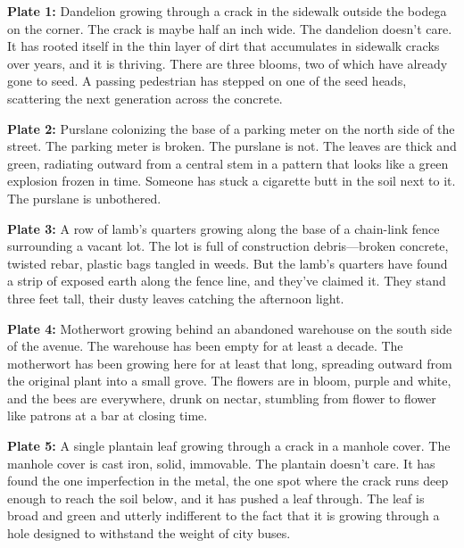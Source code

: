 \documentclass[
    language=english,
    doctype=zine,
    institution=none,
]{../../omnilatex}
\begin{document}
\begin{center}
\begin{minipage}{0.9\textwidth}

\textbf{Plate 1:} Dandelion growing through a crack in the sidewalk outside the bodega on the corner. The crack is maybe half an inch wide. The dandelion doesn't care. It has rooted itself in the thin layer of dirt that accumulates in sidewalk cracks over years, and it is thriving. There are three blooms, two of which have already gone to seed. A passing pedestrian has stepped on one of the seed heads, scattering the next generation across the concrete.

\textbf{Plate 2:} Purslane colonizing the base of a parking meter on the north side of the street. The parking meter is broken. The purslane is not. The leaves are thick and green, radiating outward from a central stem in a pattern that looks like a green explosion frozen in time. Someone has stuck a cigarette butt in the soil next to it. The purslane is unbothered.

\textbf{Plate 3:} A row of lamb's quarters growing along the base of a chain-link fence surrounding a vacant lot. The lot is full of construction debris---broken concrete, twisted rebar, plastic bags tangled in weeds. But the lamb's quarters have found a strip of exposed earth along the fence line, and they've claimed it. They stand three feet tall, their dusty leaves catching the afternoon light.

\textbf{Plate 4:} Motherwort growing behind an abandoned warehouse on the south side of the avenue. The warehouse has been empty for at least a decade. The motherwort has been growing here for at least that long, spreading outward from the original plant into a small grove. The flowers are in bloom, purple and white, and the bees are everywhere, drunk on nectar, stumbling from flower to flower like patrons at a bar at closing time.

\textbf{Plate 5:} A single plantain leaf growing through a crack in a manhole cover. The manhole cover is cast iron, solid, immovable. The plantain doesn't care. It has found the one imperfection in the metal, the one spot where the crack runs deep enough to reach the soil below, and it has pushed a leaf through. The leaf is broad and green and utterly indifferent to the fact that it is growing through a hole designed to withstand the weight of city buses.

\end{minipage}
\end{center}
\end{document}
